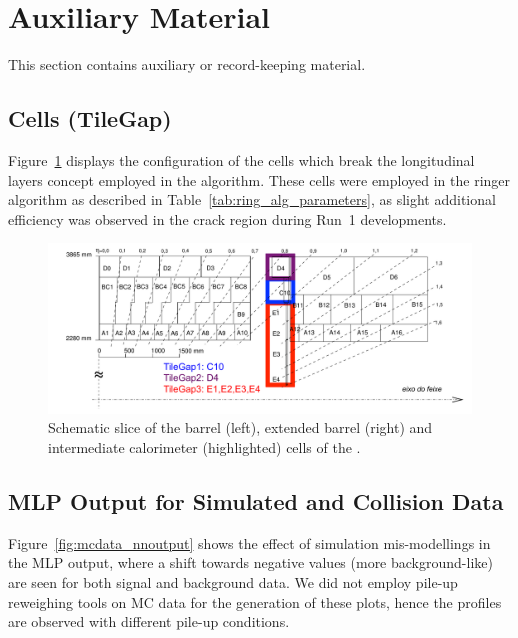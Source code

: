 \section{Auxiliary Material}%
\label{sec:aux_mat}

This section contains auxiliary or record-keeping material.

\subsection{\itc Cells (TileGap)}%
\label{ssec:tilegap}

Figure~\ref{fig:tilecal_cells} displays the configuration of the \itc cells
which break the longitudinal layers concept employed in the \rnn algorithm.
These cells were employed in the ringer algorithm as described in
Table~\ref{tab:ring_alg_parameters}, as slight additional efficiency was
observed in the crack region during Run~1 developments.

\begin{figure}[h!t]
\centering
\includegraphics[width=\textwidth]{appendices/figures/tilegap.pdf}
\caption{Schematic slice of the barrel (left), extended barrel (right) and
  intermediate calorimeter (highlighted) cells of the \tilecal.}%
\label{fig:tilecal_cells}
\end{figure}

\FloatBarrier{}
\newpage
\subsection{MLP Output for Simulated and Collision Data}\label{ssec:mcdata_nnoutput}

Figure~\ref{fig:mcdata_nnoutput} shows the effect of simulation mis-modellings
in the MLP output, where a shift towards negative values (more background-like)
are seen for both signal and background data. We did not employ pile-up
reweighing tools on MC data for the generation of these plots, hence the
profiles are observed with different pile-up conditions.

